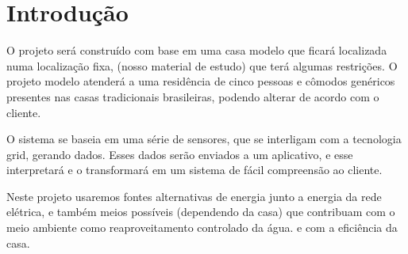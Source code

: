 \chapter{Introdução}
    \par O projeto será construído com base em uma casa modelo que ficará localizada numa localização fixa, (nosso material de estudo) que terá algumas restrições. O projeto modelo atenderá a uma residência de cinco pessoas e cômodos genéricos presentes nas casas tradicionais brasileiras, podendo alterar de acordo com o cliente. 
    \par O sistema se baseia em uma série de sensores, que se interligam com a tecnologia grid, gerando dados. Esses dados serão enviados a um aplicativo, e esse interpretará e o transformará em um sistema de fácil compreensão ao cliente. 
    \par Neste projeto usaremos fontes alternativas de energia junto a energia da rede elétrica, e também meios possíveis (dependendo da casa) que contribuam com o meio ambiente como reaproveitamento controlado da água. e com a eficiência da casa.
